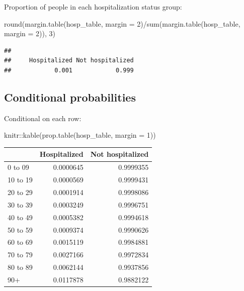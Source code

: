 \documentclass[
  openany]{book}
\newenvironment{Shaded}{\begin{snugshade}}{\end{snugshade}}
\newcommand{\AttributeTok}[1]{\textcolor[rgb]{0.77,0.63,0.00}{#1}}
\newcommand{\DecValTok}[1]{\textcolor[rgb]{0.00,0.00,0.81}{#1}}
\newcommand{\FunctionTok}[1]{\textcolor[rgb]{0.00,0.00,0.00}{#1}}
\newcommand{\NormalTok}[1]{#1}
\newcommand{\SpecialCharTok}[1]{\textcolor[rgb]{0.00,0.00,0.00}{#1}}
\begin{document}
Proportion of people in each hospitalization status group:

\begin{Shaded}
\begin{Highlighting}[]
\FunctionTok{round}\NormalTok{(}\FunctionTok{margin.table}\NormalTok{(hosp\_table, }\AttributeTok{margin =} \DecValTok{2}\NormalTok{)}\SpecialCharTok{/}\FunctionTok{sum}\NormalTok{(}\FunctionTok{margin.table}\NormalTok{(hosp\_table, }\AttributeTok{margin =} \DecValTok{2}\NormalTok{)), }\DecValTok{3}\NormalTok{)}
\end{Highlighting}
\end{Shaded}

\begin{verbatim}
## 
##     Hospitalized Not hospitalized 
##            0.001            0.999
\end{verbatim}

\hypertarget{conditional-probabilities}{%
\subsection{Conditional probabilities}\label{conditional-probabilities}}

Conditional on each row:

\begin{Shaded}
\begin{Highlighting}[]
\NormalTok{knitr}\SpecialCharTok{::}\FunctionTok{kable}\NormalTok{(}\FunctionTok{prop.table}\NormalTok{(hosp\_table, }\AttributeTok{margin =} \DecValTok{1}\NormalTok{))}
\end{Highlighting}
\end{Shaded}

\begin{tabular}{l|r|r}
\hline
  & Hospitalized & Not hospitalized\\
\hline
0 to 09 & 0.0000645 & 0.9999355\\
\hline
10 to 19 & 0.0000569 & 0.9999431\\
\hline
20 to 29 & 0.0001914 & 0.9998086\\
\hline
30 to 39 & 0.0003249 & 0.9996751\\
\hline
40 to 49 & 0.0005382 & 0.9994618\\
\hline
50 to 59 & 0.0009374 & 0.9990626\\
\hline
60 to 69 & 0.0015119 & 0.9984881\\
\hline
70 to 79 & 0.0027166 & 0.9972834\\
\hline
80 to 89 & 0.0062144 & 0.9937856\\
\hline
90+ & 0.0117878 & 0.9882122\\
\hline
\end{tabular}
\end{document}
